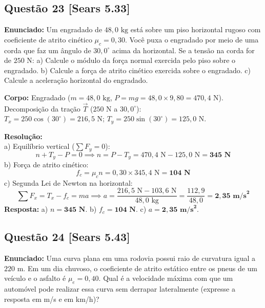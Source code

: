 \documentclass[11pt,a4paper]{article}
\begin{document}
\vspace{0.3cm}
\subsection*{Questão 23 [Sears 5.33]}
\textbf{Enunciado:} Um engradado de $48,0\text{ kg}$ está sobre um piso horizontal rugoso com coeficiente de atrito cinético $\mu_c = 0,30$. Você puxa o engradado por meio de uma corda que faz um ângulo de $30,0^\circ$ acima da horizontal. Se a tensão na corda for de $250\text{ N}$: a) Calcule o módulo da força normal exercida pelo piso sobre o engradado. b) Calcule a força de atrito cinético exercida sobre o engradado. c) Calcule a aceleração horizontal do engradado.

\begin{dclbox}
\textbf{Corpo:} Engradado ($m = 48,0\text{ kg}$, $P = mg = 48,0 \times 9,80 = 470,4\text{ N}$).\\
Decomposição da tração $\vec{T}$ ($250\text{ N}$ a $30,0^\circ$):\\
$T_x = 250 \cos(30^\circ) = 216,5\text{ N}$; $T_y = 250 \sin(30^\circ) = 125,0\text{ N}$.
\end{dclbox}

\noindent
\textbf{Resolução:}\\
a) Equilíbrio vertical ($\sum F_y = 0$):
\[ n + T_y - P = 0 \implies n = P - T_y = 470,4\text{ N} - 125,0\text{ N} = \mathbf{345\text{ N}} \]
b) Força de atrito cinético:
\[ f_c = \mu_c n = 0,30 \times 345,4\text{ N} = \mathbf{104\text{ N}} \]
c) Segunda Lei de Newton na horizontal:
\[ \sum F_x = T_x - f_c = m a \implies a = \frac{216,5\text{ N} - 103,6\text{ N}}{48,0\text{ kg}} = \frac{112,9}{48,0} = \mathbf{2,35\text{ m/s}^2} \]
\textbf{Resposta:} a) $n = \mathbf{345\text{ N}}$. b) $f_c = \mathbf{104\text{ N}}$. c) $a = \mathbf{2,35\text{ m/s}^2}$.

\vspace{0.3cm}
\subsection*{Questão 24 [Sears 5.43]}
\textbf{Enunciado:} Uma curva plana em uma rodovia possui raio de curvatura igual a $220\text{ m}$. Em um dia chuvoso, o coeficiente de atrito estático entre os pneus de um veículo e o asfalto é $\mu_e = 0,40$. Qual é a velocidade máxima com que um automóvel pode realizar essa curva sem derrapar lateralmente (expresse a resposta em m/s e em km/h)?
\end{document}
